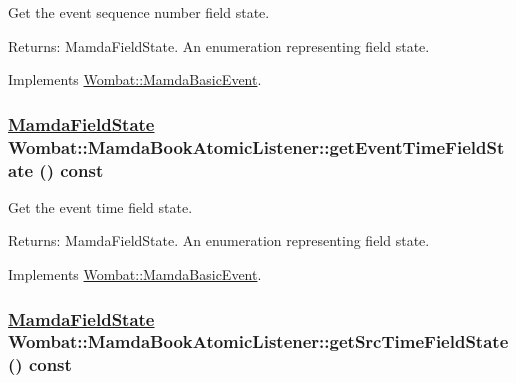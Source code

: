 Get the event sequence number field state. 

\begin{Desc}
\item[Returns:]Mamda\-Field\-State. An enumeration representing field state. \end{Desc}


Implements \hyperlink{classWombat_1_1MamdaBasicEvent_51cc0b9d4c2b8a982ccd18b339707cb5}{Wombat::Mamda\-Basic\-Event}.\hypertarget{classWombat_1_1MamdaBookAtomicListener_db8ff2c8d4bcbf00307474add61e741e}{
\subsubsection[getEventTimeFieldState]{\setlength{\rightskip}{0pt plus 5cm}\hyperlink{namespaceWombat_93aac974f2ab713554fd12a1fa3b7d2a}{Mamda\-Field\-State} Wombat::Mamda\-Book\-Atomic\-Listener::get\-Event\-Time\-Field\-State () const}}
\label{classWombat_1_1MamdaBookAtomicListener_db8ff2c8d4bcbf00307474add61e741e}


Get the event time field state. 

\begin{Desc}
\item[Returns:]Mamda\-Field\-State. An enumeration representing field state. \end{Desc}


Implements \hyperlink{classWombat_1_1MamdaBasicEvent_ff3932065e16e660fb6cd9285b46f7d0}{Wombat::Mamda\-Basic\-Event}.\hypertarget{classWombat_1_1MamdaBookAtomicListener_22cb444aedd516da0ea66a2a6ca85d39}{
\subsubsection[getSrcTimeFieldState]{\setlength{\rightskip}{0pt plus 5cm}\hyperlink{namespaceWombat_93aac974f2ab713554fd12a1fa3b7d2a}{Mamda\-Field\-State} Wombat::Mamda\-Book\-Atomic\-Listener::get\-Src\-Time\-Field\-State () const}}
\label{classWombat_1_1MamdaBookAtomicListener_22cb444aedd516da0ea66a2a6ca85d39}


